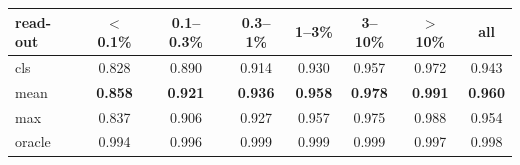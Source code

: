 \begin{tabular}{lccccccc}
\toprule
read-out & $<$0.1\% & 0.1--0.3\% & 0.3--1\% & 1--3\% & 3--10\% & $>$10\% & all \\
\midrule
cls & 0.828 & 0.890 & 0.914 & 0.930 & 0.957 & 0.972 & 0.943 \\
mean & \textbf{0.858} & \textbf{0.921} & \textbf{0.936} & \textbf{0.958} & \textbf{0.978} & \textbf{0.991} & \textbf{0.960} \\
max & 0.837 & 0.906 & 0.927 & 0.957 & 0.975 & 0.988 & 0.954 \\
\midrule
oracle & 0.994 & 0.996 & 0.999 & 0.999 & 0.999 & 0.997 & 0.998 \\
\bottomrule
\end{tabular}
